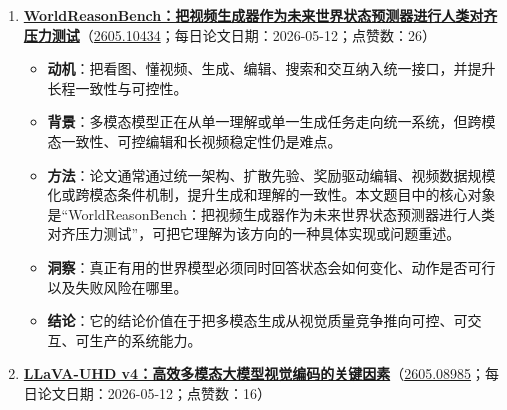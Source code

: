 \begin{enumerate}[leftmargin=1.5em]
  \begin{itemize}[leftmargin=1.5em]
    \item \textbf{动机}：把看图、懂视频、生成、编辑、搜索和交互纳入统一接口，并提升长程一致性与可控性。
    \item \textbf{背景}：多模态模型正在从单一理解或单一生成任务走向统一系统，但跨模态一致性、可控编辑和长视频稳定性仍是难点。
    \item \textbf{方法}：论文通常通过统一架构、扩散先验、奖励驱动编辑、视频数据规模化或跨模态条件机制，提升生成和理解的一致性。本文题目中的核心对象是“CollabVR：视觉语言模型与视频生成模型协同的视频推理”，可把它理解为该方向的一种具体实现或问题重述。
    \item \textbf{洞察}：生成模型的核心竞争正从单帧质量转向可控性、一致性和工作流可用性。
    \item \textbf{结论}：它的结论价值在于把多模态生成从视觉质量竞争推向可控、可交互、可生产的系统能力。
  \end{itemize}
  \item \textbf{\href{https://huggingface.co/papers/2605.10434}{WorldReasonBench：把视频生成器作为未来世界状态预测器进行人类对齐压力测试}}（\href{https://arxiv.org/abs/2605.10434}{2605.10434}；每日论文日期：2026-05-12；点赞数：26）
  \begin{itemize}[leftmargin=1.5em]
    \item \textbf{动机}：把看图、懂视频、生成、编辑、搜索和交互纳入统一接口，并提升长程一致性与可控性。
    \item \textbf{背景}：多模态模型正在从单一理解或单一生成任务走向统一系统，但跨模态一致性、可控编辑和长视频稳定性仍是难点。
    \item \textbf{方法}：论文通常通过统一架构、扩散先验、奖励驱动编辑、视频数据规模化或跨模态条件机制，提升生成和理解的一致性。本文题目中的核心对象是“WorldReasonBench：把视频生成器作为未来世界状态预测器进行人类对齐压力测试”，可把它理解为该方向的一种具体实现或问题重述。
    \item \textbf{洞察}：真正有用的世界模型必须同时回答状态会如何变化、动作是否可行以及失败风险在哪里。
    \item \textbf{结论}：它的结论价值在于把多模态生成从视觉质量竞争推向可控、可交互、可生产的系统能力。
  \end{itemize}
  \item \textbf{\href{https://huggingface.co/papers/2605.08985}{LLaVA-UHD v4：高效多模态大模型视觉编码的关键因素}}（\href{https://arxiv.org/abs/2605.08985}{2605.08985}；每日论文日期：2026-05-12；点赞数：16）
  \begin{itemize}[leftmargin=1.5em]

\end{itemize}
\end{enumerate}

